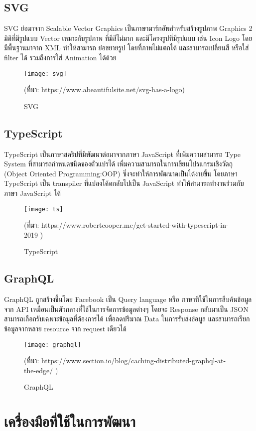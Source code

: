 \subsection{SVG}
SVG ย่อมาจาก Scalable Vector Graphics เป็นภาษามาร์กอัพสำหรับสร้างรูปภาพ Graphics 2 มิติที่มีรูปแบบ Vector
เหมาะกับรูปภาพ ที่มีสีไม่มาก และมีโครงรูปที่มีรูปแบบ เช่น Icon Logo   
โดยมีพื้นฐานมาจาก XML ทำให้สามารถ ย่อขยายรูป โดยที่ภาพไม่แตกได้ และสามารถเปลี่ยนสี หรือใส่ filter ได้ รวมถึงการใส่ Animation ได้ด้วย 

\begin{figure}[!h]
	\centering
	\texttt{[image: svg]}
	\caption{SVG}
	(ที่มา: https://www.abeautifulsite.net/svg-has-a-logo)
	\label{Fig:svg}
\end{figure}

\subsection{TypeScript}
TypeScript เป็นภาษาสคริปที่มีพัฒนาต่อมาจากภาษา JavaScript ที่เพิ่มความสามารถ Type System ที่สามารถกำหนดชนิดของตัวแปรได้
เพิ่มความสามารถในการเขียนโปรแกรมเชิงวัตถุ (Object Oriented Programming:OOP) ซึ่งจะทำให้การพัฒนาดเป็นได้ง่ายขึ้น
โดยภาษา TypeScript เป็น transpiler ที่แปลงโค้ดกลับไปเป็น JavaScript ทำให้สามารถทำงานร่วมกับภาษา JavaScript ได้
\begin{figure}[!h]
	\centering
	\texttt{[image: ts]}
	\caption{TypeScript}
	(ที่มา: 
	https://www.robertcooper.me/get-started-with-typescript-in-2019
	)
	
	\label{Fig:TypeScript}
\end{figure}

\subsection{GraphQL}
GraphQL ถูกสร้างขึ้นโดย Facebook เป็น Query language หรือ ภาษาที่ใช้ในการสืบค้นข้อมูลจาก API เหมือนเป็นตัวกลางที่ใช้ในการจัดการข้อมูลต่างๆ โดยจะ Response กลับมาเป็น JSON สามารถเลือกรับเฉพาะข้อมูลที่ต้องการได้ เพื่อลดปริมาณ Data ในการรับส่งข้อมูล และสามารถเรียกข้อมูลจากหลาย resource จาก request เดียวได้
\begin{figure}[!h]
	\centering
	\texttt{[image: graphql]}
	\caption{GraphQL}
	(ที่มา: 
	https://www.section.io/blog/caching-distributed-graphql-at-the-edge/
	)
	\label{Fig:graphql}
\end{figure}

\section{เครื่องมือที่ใช้ในการพัฒนา}
